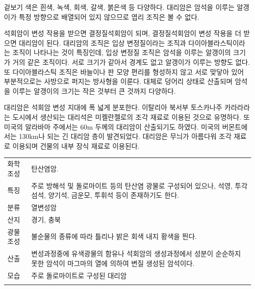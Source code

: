 \documentclass[12pt, a4paper, twoside]{book}
\begin{document}
			겉보기 색은 흰색, 녹색, 회색, 갈색, 붉은색 등 다양하다. 대리암은 암석을 이루는 알갱이가 특정 방향으로 배열되어 있지 않으므로 엽리 조직은 볼 수 없다. 
			
			석회암이 변성 작용을 받으면 결정질석회암이 되며, 결정질석회암이 변성 작용을 더 받으면 대리암이 된다. 
			대리암의 조직은 입상 변정질이라는 조직과 다이아블라스틱이라는 조직이 나타나는 것이 특징인데, 입상 변정질 조직은 암석을 이루는 알갱이의 크기가 거의 같은 조직이다. 
			서로 크기가 같아서 경계도 없고 알갱이가 이루는 방향도 없다. 
			또 다이아블라스틱 조직은 바늘이나 판 모양 편리를 형성하지 않고 서로 맞닿아 있어 부분적으로는 사방으로 퍼지는 방사형을 이룬다. 
			대체로 덩어리 상태로 산출되며 암석을 이루는 알갱이의 크기는 작은 것부터 큰 것까지 다양하다. 
			
			대리암은 석회암 변성 지대에 폭 넓게 분포한다. 이탈리아 북서부 토스카나주 카라라라는 도시에서 생산되는 대리석은 미켈란젤로의 조각 재료로 이용된 것으로 유명하다. 
			또 미국의 알라바마 주에서는 60m 두께의 대리암이 산출되기도 하였다. 
			미국의 버몬트에서는 130km나 되는 긴 대리암 층이 발견되었다. 
			대리암은 무늬가 아름다워 조각 재료로 이용되며 건물의 내부 장식 재료로 이용된다.
			

				\begin{tabu} to 1.0\textwidth { X[l, 1.0] X[l, 3.0] }
				\tabucline[0.2ex]{-}		
				화학조성		&탄산염암.\\
				특징			&주로 방해석 및 돌로마이트 등의 탄산염 광물로 구성되어 있으나, 석영, 투각섬석, 양기석, 금운모, 투휘석 등이 존재하기도 한다.\\
				분류			&열변성암 \\
				산지			&경기, 충북 \\
				광물조성		&불순물의 종류에 따라 틀리나 밝은 회색 내지 황색을 띈다. \\
				산출			&변성과정중에 유색광물의 함유나 석회암의 생성과정에서 성분이 순순하지 못한 암석이 마그마의 열에 의하여 변질 생성된 암석이다. \\
				모습			&주로 돌로마이트로 구성된 대리암 \\
				\tabucline[0.1ex]{-}		
				\end{tabu} 
\end{document}
